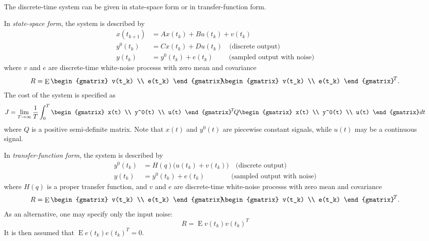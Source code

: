 \documentclass[final,twoside]{rapport}  %
\DeclareMathOperator{\E}{E}
\begin{document}
\descr
The discrete-time system can be given in state-space form or in
transfer-function form.

In {\em state-space form}, the system is described by
\[
\begin{aligned}
x(t_{k+1}) &= A x(t_k) + B u (t_k) + v(t_k) \\
y^0(t_k) &= C x(t_k) + D u(t_k) \quad \text{(discrete output)}\\
y(t_k) &= y^0(t_k) + e(t_k) \qquad \; \text{(sampled output with noise)}
\end{aligned}
\]
where $v$ and $e$ are discrete-time white-noise processs with zero
mean and covariance
\[
R = \E \begin{gmatrix} v(t_k) \\ e(t_k) \end{gmatrix} \!\!
\begin{gmatrix} v(t_k)
  \\ e(t_k) \end{gmatrix}^{\!T}.
\]
The cost of the system is specified as 
\[
J = \lim_{T \rightarrow \infty} \frac{1}{T} \int_0^T
  \begin{gmatrix} x(t) \\ y^0(t) \\ u(t) \end{gmatrix}^{\!T} \! Q
  \begin{gmatrix} x(t) \\ y^0(t) \\ u(t) \end{gmatrix} dt
\]
where $Q$ is a positive semi-definite matrix. Note that $x(t)$ and $y^0(t)$
are piecewise constant signals, while $u(t)$ may be a continuous signal.

In {\em transfer-function form}, the system is described by
\[
\begin{aligned}
y^0(t_k) &= H(q) \bigl( u(t_k) + v(t_k) \bigr) \quad \text{(discrete
  output)}\\
y(t_k) &= y^0(t_k) + e(t_k) \qquad\quad\;\;\; \text{(sampled output with noise)}
\end{aligned}
\]
where $H(q)$ is a proper transfer function, and
$v$ and $e$ are discrete-time white-noise processs with zero
mean and covariance 
\[
R = \E \begin{gmatrix} v(t_k) \\ e(t_k) \end{gmatrix} \!\!
\begin{gmatrix} v(t_k)
  \\ e(t_k) \end{gmatrix}^{\!T}.
\]
As an alternative, one may specify only the input noise:
\[
R = \E v(t_k)v(t_k)^{\!T}
\]
It is then assumed that $\E e(t_k)e(t_k)^{\!T} =0$.
\end{document}
